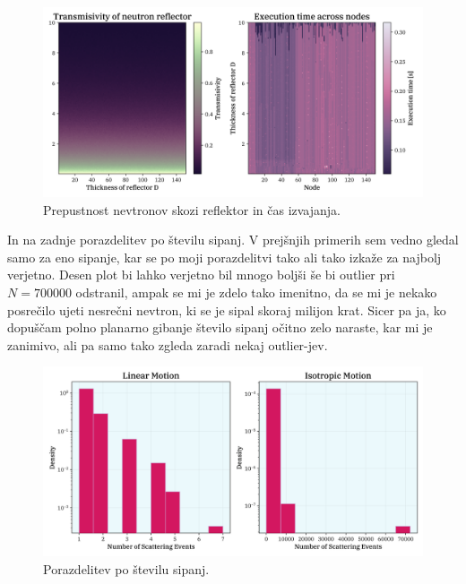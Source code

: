 \documentclass[a4paper]{article}
\begin{document}
\begin{figure}[H]
    \centering
    \includegraphics[width=\textwidth]{../NeutronReflector/Images/isotropic_motion.png}
    \caption{Prepustnost nevtronov skozi reflektor in čas izvajanja.}
    \label{fig:isotropic_motion}
\end{figure}

In na zadnje porazdelitev po številu sipanj. V prejšnjih primerih sem vedno gledal samo za eno sipanje, kar se po moji
porazdelitvi tako ali tako izkaže za najbolj verjetno. Desen plot bi lahko verjetno bil mnogo boljši še bi outlier pri 
$N = 700000$ odstranil, ampak se mi je zdelo tako imenitno, da se mi je nekako posrečilo ujeti nesrečni nevtron, ki se 
je sipal skoraj milijon krat. Sicer pa ja, ko dopuščam polno planarno gibanje število sipanj očitno zelo naraste, kar mi 
je zanimivo, ali pa samo tako zgleda zaradi nekaj outlier-jev. \\

\begin{figure}[H]
    \centering
    \includegraphics[width=\textwidth]{../NeutronReflector/Images/scattering.png}
    \caption{Porazdelitev po številu sipanj.}
    \label{fig:scatter}
\end{figure}
\end{document}

